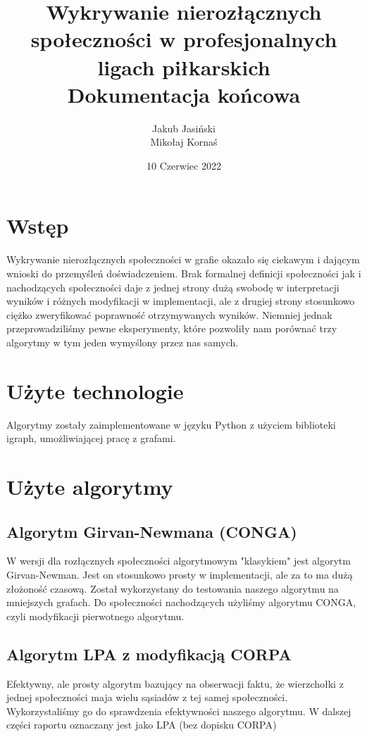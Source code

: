 \documentclass{article}
\title{Wykrywanie nierozłącznych społeczności w profesjonalnych ligach piłkarskich \\ Dokumentacja końcowa}
\author{Jakub Jasiński \\ Mikołaj Kornaś}
\date{10 Czerwiec 2022}
\begin{document}
\maketitle

\section{Wstęp}

Wykrywanie nierozłącznych społeczności w grafie okazało się ciekawym i dającym wnioski do przemyśleń doświadczeniem. Brak formalnej definicji społeczności jak i nachodzących społeczności daje z jednej strony dużą swobodę w interpretacji wyników i różnych modyfikacji w implementacji, ale z drugiej strony stosunkowo ciężko zweryfikować poprawność otrzymywanych wyników. Niemniej jednak przeprowadziliśmy pewne eksperymenty, które pozwoliły nam porównać trzy algorytmy w tym jeden wymyślony przez nas samych.

\section{Użyte technologie}
Algorytmy zostały zaimplementowane w języku Python z użyciem biblioteki igraph, umożliwiającej pracę z grafami. 

\section{Użyte algorytmy}

\subsection{Algorytm Girvan-Newmana (CONGA)}
W wersji dla rozłącznych społeczności algorytmowym "klasykiem" jest algorytm Girvan-Newman. Jest on stosunkowo prosty w implementacji, ale za to ma dużą złożoność czasową. Został wykorzystany do testowania naszego algorytmu na mniejszych grafach. Do społeczności nachodzących użyliśmy algorytmu CONGA, czyli modyfikacji pierwotnego algorytmu.

\subsection{Algorytm LPA z modyfikacją CORPA}
Efektywny, ale prosty algorytm bazujący na obserwacji faktu, że wierzchołki z jednej społeczności maja wielu sąsiadów z tej samej społeczności. Wykorzystaliśmy go do sprawdzenia efektywności naszego algorytmu. W dalszej części raportu oznaczany jest jako LPA (bez dopisku CORPA)
\end{document}
